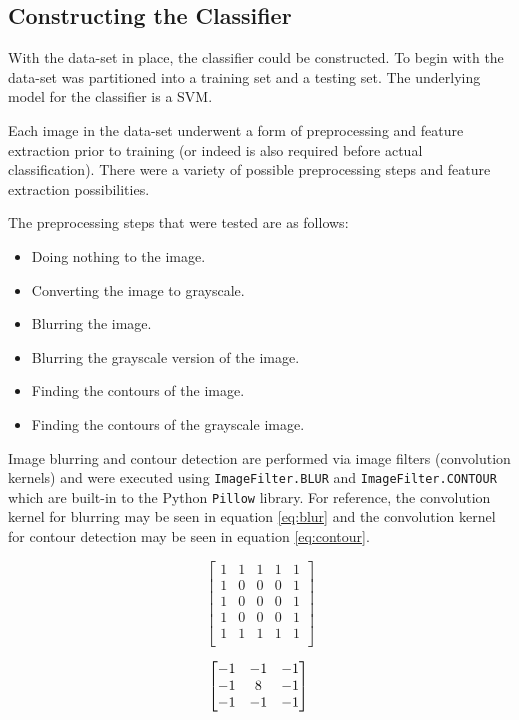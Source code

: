 \documentclass[letterpaper, 10 pt, conference]{conf/ieeeconf}  %
\begin{document}
\subsection{Constructing the Classifier} %
With the data-set in place, the classifier could be constructed. To begin with
the data-set was partitioned into a training set and a testing set. The
underlying model for the classifier is a SVM.

Each image in the data-set underwent a form of preprocessing and feature
extraction prior to training (or indeed is also required before actual
classification). There were a variety of possible preprocessing steps and
feature extraction possibilities.

The preprocessing steps that were tested are as follows:
\begin{itemize}
\item Doing nothing to the image.
\item Converting the image to grayscale.
\item Blurring the image.
\item Blurring the grayscale version of the image.
\item Finding the contours of the image.
\item Finding the contours of the grayscale image.
\end{itemize}

Image blurring and contour detection are performed via image filters
(convolution kernels) and were executed using \texttt{ImageFilter.BLUR} and
\texttt{ImageFilter.CONTOUR} which are built-in to the Python \texttt{Pillow}
library. For reference, the convolution kernel for blurring may be seen in
equation \eqref{eq:blur} and the convolution kernel for contour detection may be
seen in equation \eqref{eq:contour}.

\noindent\begin{minipage}{.5\linewidth}
  \begin{equation}
    \begin{bmatrix}
      1 & 1 & 1 & 1 & 1\\
      1 & 0 & 0 & 0 & 1\\
      1 & 0 & 0 & 0 & 1\\
      1 & 0 & 0 & 0 & 1\\
      1 & 1 & 1 & 1 & 1\\
    \end{bmatrix}
    \label{eq:blur}
  \end{equation}
\end{minipage}%
\begin{minipage}{.5\linewidth}
  \begin{equation}
    \begin{bmatrix}
      -1 & -1 & -1\\
      -1 &  8 & -1\\
      -1 & -1 & -1\\
    \end{bmatrix}\\
    \label{eq:contour}
  \end{equation}
\end{minipage}\\
\end{document}
